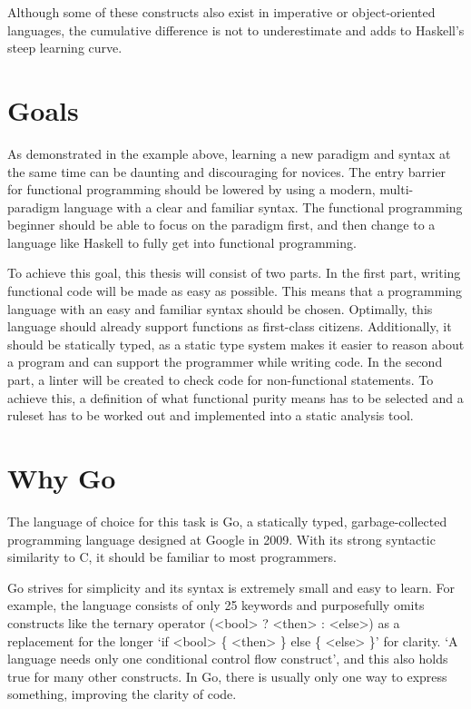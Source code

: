 Although some of these constructs also exist in imperative or object-oriented languages, the cumulative difference
is not to underestimate and adds to Haskell's steep learning curve.

\section{Goals}

As demonstrated in the example above, learning a new paradigm and syntax at the same time
can be daunting and discouraging for novices.
The entry barrier for functional programming should be lowered by
using a modern, multi-paradigm language with a clear and familiar syntax. The functional
programming beginner should be able to focus on the paradigm first, and then change to a language
like Haskell to fully get into functional programming.

To achieve this goal, this thesis will consist of two parts.
In the first part, writing functional code will be made as easy as possible. This means that
a programming language with an easy and familiar syntax should be chosen. Optimally, this language
should already support functions as first-class citizens. Additionally, it should be statically
typed, as a static type system makes it easier to reason about a program and can support the
programmer while writing code.
In the second part, a linter will be created to check code for non-functional statements. To achieve
this, a definition of what functional purity means has to be selected and a ruleset has to be
worked out and implemented into a static analysis tool.

\section{Why Go}\label{sec:why-go}

The language of choice for this task is Go, a statically typed, garbage-collected programming language
designed at Google in 2009\autocite{golang-publish}. With its strong syntactic similarity to C, it should
be familiar to most programmers.

Go strives for simplicity and its syntax is extremely small and easy to learn. For example, the
language consists of only 25 keywords and purposefully omits constructs like the ternary operator
(<bool> ? <then> : <else>) as a replacement for the longer `if <bool> \{ <then> \} else \{ <else> \}'
for clarity. `A language needs only one conditional control flow construct'\autocite{go-ternary},
and this also holds true for many other constructs. In Go, there is usually only one way
to express something, improving the clarity of code.

